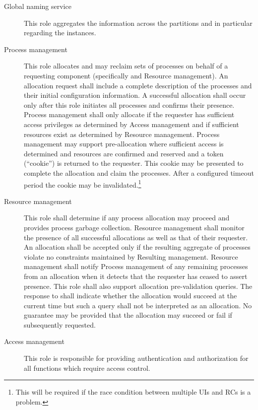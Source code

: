 \begin{description}
\item[Global naming service] This role aggregates the  information across the partitions and in particular regarding the  instances.

\item[Process management] This role allocates and may reclaim sets of processes on behalf of a requesting component (specifically  and Resource management). 
  An allocation request shall include a complete description of the processes and their initial configuration information. 
  A successful allocation shall occur only after this role initiates all processes and confirms their presence. 
  Process management shall only allocate if the requester has sufficient access privileges as determined by Access management and if sufficient resources exist as determined by Resource management. 
  Process management may support pre-allocation where sufficient access is determined and resources are confirmed and reserved and a token (``cookie'') is returned to the requester. 
  This cookie may be presented to complete the allocation and claim the processes. 
  After a configured timeout period the cookie may be invalidated.\footnote{This will be required if the race condition between multiple UIs and RCs is a problem.}  
  
\item[Resource management] This role shall determine if any process allocation may proceed and provides process garbage collection. 
  Resource management shall monitor the presence of all successful allocations as well as that of their requester.  
  An allocation shall be accepted only if the resulting aggregate of processes violate no constraints maintained by Resulting management.
  Resource management shall notify Process management of any remaining processes from an allocation when it detects that the requester has ceased to assert presence.
  This role shall also support allocation pre-validation queries. 
  The response to shall indicate whether the allocation would succeed at the current time but such a query shall not be interpreted as an allocation. 
  No guarantee may be provided that the allocation may succeed or fail if subsequently requested.

  
\item[Access management] This role is responsible for providing authentication and authorization for all  functions which require access control.  

\end{description}

